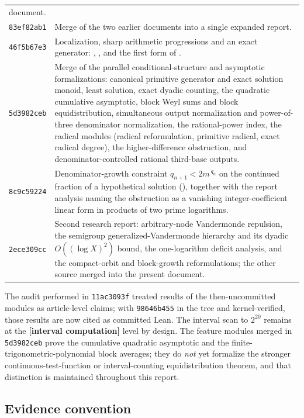 \documentclass[11pt,oneside]{article}
\theoremstyle{definition}
\theoremstyle{remark}
\newcommand{\lean}[1]{\texttt{\detokenize{#1}}}
\newcommand{\commit}[1]{\texttt{#1}}
\newcommand{\statuscomp}{\textcolor{computeviolet}{\textbf{[interval computation]}}}
\begin{document}
\begin{longtable}{@{}p{}p{}@{}}
document. \\
\addlinespace
\commit{83ef82ab1} & Merge of the two earlier documents into a single expanded report. \\
\addlinespace
\commit{46f5b67e3} & Localization, sharp arithmetic progressions and an exact generator:
\lean{Localization}, \lean{SharpProgression}, and the first form of
\lean{PrimitiveGenerator}. \\
\addlinespace
\commit{5d3982ceb} & Merge of the parallel conditional-structure and asymptotic
formalizations: canonical primitive generator and exact solution monoid, least solution,
exact dyadic counting, the quadratic cumulative asymptotic, block Weyl sums and block
equidistribution, simultaneous output normalization and power-of-three denominator
normalization, the rational-power index, the radical modules (radical reformulation,
primitive radical, exact radical degree), the higher-difference obstruction, and
denominator-controlled rational third-base outputs. \\
\addlinespace
\commit{8c9c59224} & Denominator-growth constraint
$q_{n+1}<2m^{\,q_n}$ on the continued fraction of a hypothetical solution
(\lean{DenominatorGrowth}), together with the report analysis naming the obstruction as a
vanishing integer-coefficient linear form in products of two prime logarithms. \\
\addlinespace
\commit{2ece309cc} & Second research report: arbitrary-node Vandermonde repulsion, the
semigroup generalized-Vandermonde hierarchy and its dyadic $O((\log X)^2)$ bound, the
one-logarithm deficit analysis, and the compact-orbit and block-growth reformulations; the
other source merged into the present document. \\
\bottomrule
\end{longtable}

The audit performed in \commit{11ac3093f} treated results of the then-uncommitted modules as
article-level claims; with \commit{98646b455} in the tree and kernel-verified, those results
are now cited as committed Lean.  The interval scan to $2^{20}$ remains at the
\statuscomp{} level by design.  The feature modules merged in \commit{5d3982ceb} prove the
cumulative quadratic asymptotic and the finite-trigonometric-polynomial block averages; they
do \emph{not} yet formalize the stronger continuous-test-function or interval-counting
equidistribution theorem, and that distinction is maintained throughout this report.

\subsection{Evidence convention}
\label{pr:evidence-convention}
\end{document}
